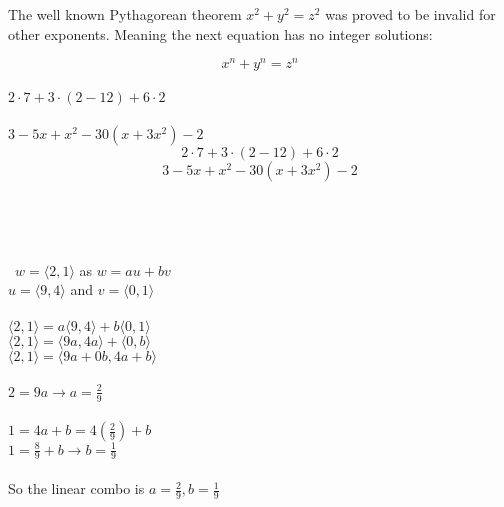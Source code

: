 \documentclass{article}
\begin{document}
The well known Pythagorean theorem \(x^2 + y^2 = z^2\) was 
proved to be invalid for other exponents. 
Meaning the next equation has no integer solutions:

\[ x^n + y^n = z^n \]
\\
\noindent
$2 \cdot 7 + 3 \cdot (2 - 12) + 6 \cdot 2$
\\
\\
$3 - 5x + x^2 - 30(x+3x^2) - 2$
\[2 \cdot 7 + 3 \cdot (2 - 12) + 6 \cdot 2\]
\[3 - 5x + x^2 - 30(x+3x^2) - 2\]
\\\\\\\\\
$w= \langle2,1\rangle$ as $w=au+bv$\\
$u = \langle9,4\rangle$ and $v=\langle0,1\rangle$\\\\
$\langle2,1\rangle = a\langle9,4\rangle + b\langle0,1\rangle$\\
$\langle2,1\rangle = \langle9a,4a\rangle + \langle0,b\rangle$\\
$\langle2,1\rangle = \langle9a+0b,4a+b\rangle$\\\\
$2 = 9a \rightarrow a=\frac{2}{9}$\\\\
$1 = 4a+b = 4\left(\frac{2}{9}\right)+b$\\
$1 = \frac{8}{9} + b \rightarrow b=\frac{1}{9}$\\\\
So the linear combo is $a=\frac{2}{9},b=\frac{1}{9}$ 
\end{document}
